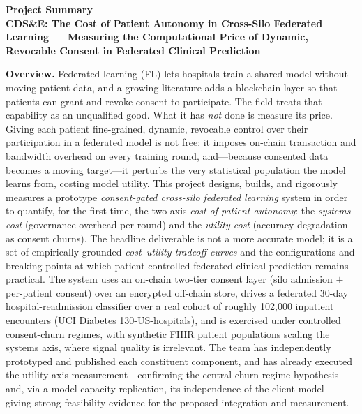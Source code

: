 \documentclass[11pt]{article}
\newcommand{\ptitle}{CDS\&E: The Cost of Patient Autonomy in Cross-Silo
Federated Learning --- Measuring the Computational Price of Dynamic,
Revocable Consent in Federated Clinical Prediction}
\begin{document}
\begin{center}
  \textbf{Project Summary}\\[2pt]\textbf{\ptitle}
\end{center}

\noindent\textbf{Overview.}
Federated learning (FL) lets hospitals train a shared model without moving
patient data, and a growing literature adds a blockchain layer so that patients
can grant and revoke consent to participate. The field treats that capability as
an unqualified good. What it has \emph{not} done is measure its price. Giving
each patient fine-grained, dynamic, revocable control over their participation in
a federated model is not free: it imposes on-chain transaction and bandwidth
overhead on every training round, and---because consented data becomes a moving
target---it perturbs the very statistical population the model learns from,
costing model utility. This project designs, builds, and rigorously measures a
prototype \emph{consent-gated cross-silo federated learning} system in order to
quantify, for the first time, the two-axis \emph{cost of patient autonomy}: the
\emph{systems cost} (governance overhead per round) and the \emph{utility cost}
(accuracy degradation as consent churns). The headline deliverable is not a more
accurate model; it is a set of empirically grounded \emph{cost--utility tradeoff
curves} and the configurations and breaking points at which patient-controlled
federated clinical prediction remains practical. The system uses an on-chain
two-tier
consent layer (silo admission $+$ per-patient consent) over an encrypted
off-chain store, drives a federated 30-day hospital-readmission classifier over
a real cohort of roughly 102{,}000 inpatient encounters (UCI Diabetes
130-US-hospitals), and is exercised under controlled consent-churn regimes, with
synthetic FHIR patient populations scaling the systems axis, where signal
quality is irrelevant. The team has independently prototyped and
published each constituent component, and has already executed the utility-axis
measurement---confirming the central churn-regime hypothesis and, via a
model-capacity replication, its independence of the client model---giving
strong feasibility evidence for the proposed integration and measurement.
\end{document}
